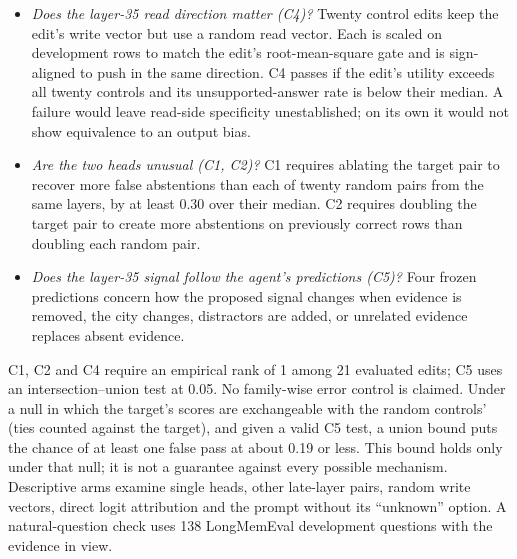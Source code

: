 \begin{itemize}[leftmargin=*]
  \item \emph{Does the layer-35 read direction matter (C4)?} Twenty control edits keep the edit's write vector but use
        a random read vector. Each is scaled on development rows to match the edit's root-mean-square gate and is
        sign-aligned to push in the same direction. C4 passes if the edit's utility exceeds all twenty controls and its
        unsupported-answer rate is below their median. A failure would leave read-side specificity unestablished; on
        its own it would not show equivalence to an output bias.
  \item \emph{Are the two heads unusual (C1, C2)?} C1 requires ablating the target pair to recover more false
        abstentions than each of twenty random pairs from the same layers, by at least 0.30 over their median. C2
        requires doubling the target pair to create more abstentions on previously correct rows than doubling each
        random pair.
  \item \emph{Does the layer-35 signal follow the agent's predictions (C5)?} Four frozen predictions concern how the
        proposed signal changes when evidence is removed, the city changes, distractors are added, or unrelated
        evidence replaces absent evidence.
\end{itemize}
C1, C2 and C4 require an empirical rank of 1 among 21 evaluated edits; C5 uses an intersection--union test at 0.05.
No family-wise error control is claimed. Under a null in which the target's scores are exchangeable with the random
controls' (ties counted against the target), and given a valid C5 test, a union bound puts the chance of at least one
false pass at about 0.19 or less. This bound holds only under that null; it is not a guarantee against every possible
mechanism. Descriptive arms examine single heads, other late-layer pairs, random write vectors, direct logit
attribution and the prompt without its ``unknown'' option. A natural-question check uses 138 LongMemEval development
questions with the evidence in view.
